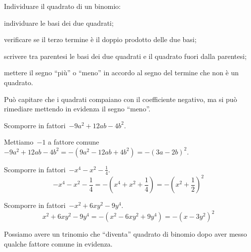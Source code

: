 \begin{procedura}
Individuare il quadrato di un binomio:
\begin{enumeratea}
\item individuare le basi dei due quadrati;
\item verificare se il terzo termine è il doppio prodotto delle due basi;
\item scrivere tra parentesi le basi dei due quadrati e il quadrato fuori 
 dalla parentesi;
\item mettere il segno ``più'' o ``meno'' in accordo al segno del termine che 
 non è un quadrato.
\end{enumeratea}
\end{procedura}

Può capitare che i quadrati compaiano con il coefficiente negativo, ma si può 
rimediare mettendo in evidenza il segno ``meno''.

\begin{exrig}
 \begin{esempio}
Scomporre in fattori~$-9a^{2}+12{ab}-4b^{2}$.

Mettiamo~$-1$ a fattore 
comune~$-9a^{2}+12ab-4b^{2}=-(9a^{2}-12{ab}+4b^{2})=-(3a-2b)^{2}$.
 \end{esempio}

 \begin{esempio}
Scomporre in fattori~$-x^{4}-x^{2}-\frac{1}{4}$.
\[-x^{4}-x^{2}-\frac{1}{4}=-\left(x^{4}+x^{2}+\frac{1}{4}\right)=
  -\left(x^{2}+\frac{1}{2}\right)^{2}\]
 \end{esempio}

 \begin{esempio}
Scomporre in fattori~$-x^{2}+6xy^{2}-9y^{4}$.
\[x^{2}+6xy^{2}-9y^{4}=-\left(x^{2}-6xy^{2}+9y^{4}\right)=
  -\left(x-3y^{2}\right)^{2}\]
 \end{esempio}
\end{exrig}

Possiamo avere un trinomio che ``diventa'' quadrato di binomio dopo aver messo 
qualche fattore comune in evidenza.

